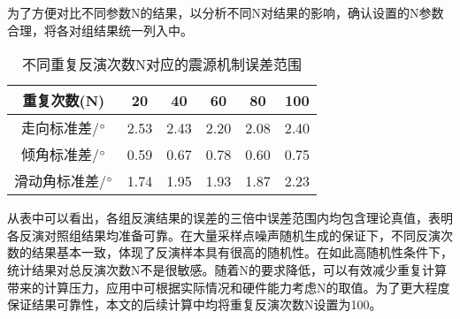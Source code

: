 为了方便对比不同参数N的结果，以分析不同N对结果的影响，确认设置的N参数合理，将各对组结果统一列入中。
\begin{table}[ht]
\centering
\caption{不同重复反演次数N对应的震源机制误差范围}
\label{tab3_07}
    \begin{tabular}{c c c c c c}
    \hline
    重复次数(N)				& 20	& 40	& 60	& 80	& 100 \\
    \hline
	走向标准差/$^\circ$	& 2.53	& 2.43  & 2.20  & 2.08  & 2.40 \\
	倾角标准差/$^\circ$	& 0.59  & 0.67  & 0.78  & 0.60  & 0.75 \\
	滑动角标准差/$^\circ$	& 1.74  & 1.95  & 1.93  & 1.87  & 2.23 \\
    \hline
    \end{tabular}
\end{table}


从表中可以看出，各组反演结果的误差的三倍中误差范围内均包含理论真值，表明各反演对照组结果均准备可靠。在大量采样点噪声随机生成的保证下，不同反演次数的结果基本一致，体现了反演样本具有很高的随机性。在如此高随机性条件下，统计结果对总反演次数N不是很敏感。随着N的要求降低，可以有效减少重复计算带来的计算压力，应用中可根据实际情况和硬件能力考虑N的取值。为了更大程度保证结果可靠性，本文的后续计算中均将重复反演次数N设置为100。
